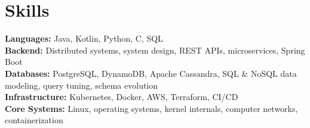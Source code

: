 \documentclass[letterpaper,10pt]{article}
\begin{document}
\section{Skills}
\begin{itemize}[leftmargin=0.15in, label={}]
  \small{\item{
    \textbf{Languages:} Java, Kotlin, Python, C, SQL \\ \vspace{3pt}
    \textbf{Backend:} Distributed systems, system design, REST APIs, microservices, Spring Boot \\ \vspace{3pt}
    \textbf{Databases:} PostgreSQL, DynamoDB, Apache Cassandra, SQL \& NoSQL data modeling, query tuning, schema evolution \\ \vspace{3pt}
    \textbf{Infrastructure:} Kubernetes, Docker, AWS, Terraform, CI/CD \\ \vspace{3pt}
    \textbf{Core Systems:} Linux, operating systems, kernel internals, computer networks, containerization
  }}
\end{itemize}
\end{document}
